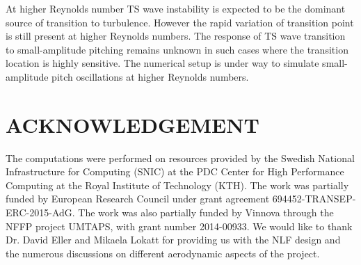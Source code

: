\documentclass[twocolumn,10pt]{tsfp}
\begin{document}
At higher Reynolds number TS wave instability is expected to be the dominant source of transition to turbulence. However the rapid variation of transition point is still present at higher Reynolds numbers. The response of TS wave transition to small-amplitude pitching remains unknown in such cases where the transition location is highly sensitive. The numerical setup is under way to simulate small-amplitude pitch oscillations at higher Reynolds numbers.

\section*{ACKNOWLEDGEMENT} 

The computations were performed on resources provided by the Swedish National Infrastructure for Computing (SNIC) at the PDC Center for High Performance Computing at the Royal Institute of Technology (KTH). The work was partially funded by European Research Council under grant agreement 694452-TRANSEP-ERC-2015-AdG. The work was also partially funded by Vinnova through the NFFP project UMTAPS, with grant number 2014-00933. We would like to thank Dr. David Eller and Mikaela Lokatt for providing us with the NLF design and the numerous discussions on different aerodynamic aspects of the project.




%
%
%
%
%

\end{document}
